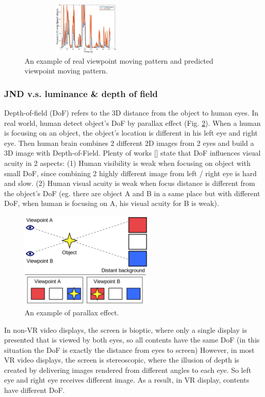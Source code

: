\begin{figure}
  \centering
  \includegraphics[width=2.5in, height=1in]{images/speed_analysis.eps}
  \caption{An example of real viewpoint moving pattern and predicted viewpoint moving pattern.}
  \label{speed_analysis}
  \end{figure}

\subsubsection{JND v.s. luminance \& depth of field}

Depth-of-field (DoF) refers to the 3D distance from the object to human eyes. In real world, human detect object's DoF by parallax effect (Fig. \ref{v-aconflict}). When a human is focusing on an object, the object's location is different in his left eye and right eye. Then human brain combines 2 different 2D images from 2 eyes and build a 3D image with Depth-of-Field. Plenty of works [] state that DoF influences visual acuity in 2 aspects: (1) Human visibility is weak when focusing on object with small DoF, since combining 2 highly different image from left / right eye is hard and slow. (2) Human visual acuity is weak when focus distance is different from the object's DoF (eg. there are object A and B in a same place but with different DoF, when human is focusing on A, his visual acuity for B is weak).

\begin{figure}
  \centering
  \includegraphics[width=2.5in]{images/ver-acc.jpg}
  \caption{An example of parallax effect.}
  \label{v-aconflict}
  \end{figure}

In non-VR video displays, the screen is bioptic, where only a single display is presented that is viewed by both eyes, so all contents have the same DoF (in this situation the DoF is exactly the distance from eyes to screen) However, in most VR video displays, the screen is stereoscopic, where the illusion of depth is created by delivering images rendered from different angles to each eye. So left eye and right eye receives different image. As a result, in VR display, contents have different DoF.

